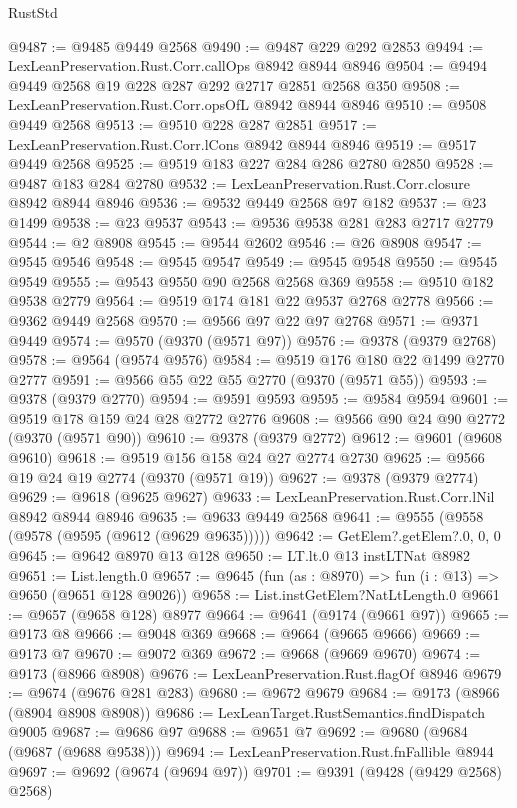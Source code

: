 \begin{lexlean}{RustStd}
\begin{coremodule}
@9487 := @9485 @9449 @2568
@9490 := @9487 @229 @292 @2853
@9494 := LexLeanPreservation.Rust.Corr.callOps @8942 @8944 @8946
@9504 := @9494 @9449 @2568 @19 @228 @287 @292 @2717 @2851 @2568 @350
@9508 := LexLeanPreservation.Rust.Corr.opsOfL @8942 @8944 @8946
@9510 := @9508 @9449 @2568
@9513 := @9510 @228 @287 @2851
@9517 := LexLeanPreservation.Rust.Corr.lCons @8942 @8944 @8946
@9519 := @9517 @9449 @2568
@9525 := @9519 @183 @227 @284 @286 @2780 @2850
@9528 := @9487 @183 @284 @2780
@9532 := LexLeanPreservation.Rust.Corr.closure @8942 @8944 @8946
@9536 := @9532 @9449 @2568 @97 @182
@9537 := @23 @1499
@9538 := @23 @9537
@9543 := @9536 @9538 @281 @283 @2717 @2779
@9544 := @2 @8908
@9545 := @9544 @2602
@9546 := @26 @8908
@9547 := @9545 @9546
@9548 := @9545 @9547
@9549 := @9545 @9548
@9550 := @9545 @9549
@9555 := @9543 @9550 @90 @2568 @2568 @369
@9558 := @9510 @182 @9538 @2779
@9564 := @9519 @174 @181 @22 @9537 @2768 @2778
@9566 := @9362 @9449 @2568
@9570 := @9566 @97 @22 @97 @2768
@9571 := @9371 @9449
@9574 := @9570 (@9370 (@9571 @97))
@9576 := @9378 (@9379 @2768)
@9578 := @9564 (@9574 @9576)
@9584 := @9519 @176 @180 @22 @1499 @2770 @2777
@9591 := @9566 @55 @22 @55 @2770 (@9370 (@9571 @55))
@9593 := @9378 (@9379 @2770)
@9594 := @9591 @9593
@9595 := @9584 @9594
@9601 := @9519 @178 @159 @24 @28 @2772 @2776
@9608 := @9566 @90 @24 @90 @2772 (@9370 (@9571 @90))
@9610 := @9378 (@9379 @2772)
@9612 := @9601 (@9608 @9610)
@9618 := @9519 @156 @158 @24 @27 @2774 @2730
@9625 := @9566 @19 @24 @19 @2774 (@9370 (@9571 @19))
@9627 := @9378 (@9379 @2774)
@9629 := @9618 (@9625 @9627)
@9633 := LexLeanPreservation.Rust.Corr.lNil @8942 @8944 @8946
@9635 := @9633 @9449 @2568
@9641 := @9555 (@9558 (@9578 (@9595 (@9612 (@9629 @9635)))))
@9642 := GetElem?.getElem?.{0, 0, 0}
@9645 := @9642 @8970 @13 @128
@9650 := LT.lt.{0} @13 instLTNat @8982
@9651 := List.length.{0}
@9657 := @9645 (fun (as : @8970) => fun (i : @13) => @9650 (@9651 @128 @9026))
@9658 := List.instGetElem?NatLtLength.{0}
@9661 := @9657 (@9658 @128) @8977
@9664 := @9641 (@9174 (@9661 @97))
@9665 := @9173 @8
@9666 := @9048 @369
@9668 := @9664 (@9665 @9666)
@9669 := @9173 @7
@9670 := @9072 @369
@9672 := @9668 (@9669 @9670)
@9674 := @9173 (@8966 @8908)
@9676 := LexLeanPreservation.Rust.flagOf @8946
@9679 := @9674 (@9676 @281 @283)
@9680 := @9672 @9679
@9684 := @9173 (@8966 (@8904 @8908 @8908))
@9686 := LexLeanTarget.RustSemantics.findDispatch @9005
@9687 := @9686 @97
@9688 := @9651 @7
@9692 := @9680 (@9684 (@9687 (@9688 @9538)))
@9694 := LexLeanPreservation.Rust.fnFallible @8944
@9697 := @9692 (@9674 (@9694 @97))
@9701 := @9391 (@9428 (@9429 @2568) @2568)

\end{coremodule}
\end{lexlean}
